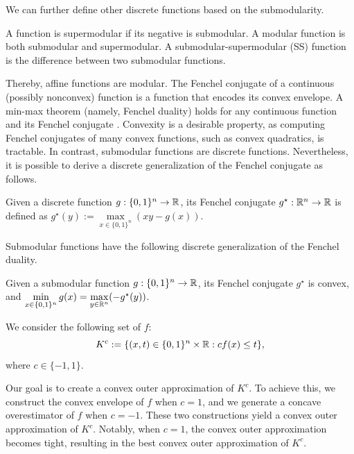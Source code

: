  
 
We can further define other discrete functions based on the submodularity.

\begin{definition}
A  function is supermodular if its negative is submodular.
    A modular function is both submodular and supermodular. A submodular-supermodular (SS) function is the difference between two submodular functions.
\end{definition}

 Thereby, affine functions are modular. The Fenchel conjugate of a continuous (possibly nonconvex) function is a  function that encodes its convex envelope.
A min-max theorem (namely, Fenchel duality) holds for any continuous function and its  Fenchel conjugate \cite{hiriart2004fundamentals}. Convexity is a desirable property, as computing Fenchel conjugates of many convex functions, such as convex quadratics, is tractable. In contrast, submodular functions are discrete functions. Nevertheless, it is possible to derive a discrete generalization of the Fenchel conjugate as follows.

\begin{definition}
\label{def.fenchel}
Given a  discrete function $g: \{0,1\}^n \to \mathbb R$, its Fenchel conjugate $g^\star: \mathbb R^n \to \mathbb R$  is defined as $g^\star(y):=\max\limits_{x \in \{0,1\}^n}(x y-g(x))$.
\end{definition}


Submodular functions  \cite{murota1998discrete} have the following discrete generalization of the Fenchel duality.
 \begin{lemma}
 \label{lem.fenchel}
 Given a  submodular function $g: \{0,1\}^n \to \mathbb R$,  its Fenchel conjugate $g^\star$ is convex, and $\min\limits_{x \in \{0,1\}^n} g(x) = \max\limits_{y \in \mathbb R^n}(-g^\star(y))$.
 \end{lemma}

We consider the following set of $f$:
\begin{equation}
    K^c:=\{(x,t) \in \{0,1\}^n \times \mathbb R: c f(x) \le t \},
\end{equation}
where $c \in \{-1,1\}$.

Our goal is to create a convex outer approximation of $K^c$. To achieve this, we construct the convex envelope of $f$ when $c=1$, and we generate a concave overestimator of $f$ when $c=-1$. These two constructions  yield a convex outer approximation of $K^c$. Notably, when $c=1$, the convex outer approximation becomes tight, resulting in the best convex outer approximation of $K^c$.



